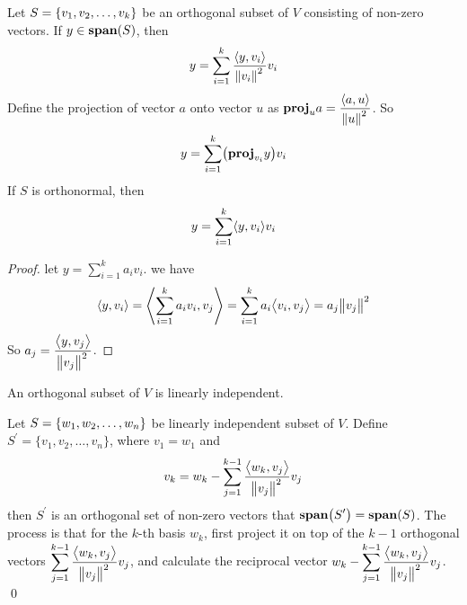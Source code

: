 \begin{theorem}
	Let $S=\set{ v_1, v_2, \dots, v_k }$ be an orthogonal subset of $V$ consisting of non-zero vectors. If $y \in \vectorspan{S}$, then
	\begin{equation}
		y = \sum_{i=1}^k \frac{\innerproduct{y}{v_i}}{\norm{v_i}^2} v_i
	\end{equation}
	Define the projection of vector $a$ onto vector $u$ as $\projection{a}{u} = \dfrac{\innerproduct{a}{u}}{\norm{u}^2}$. So 
	\begin{equation}
	    y = \sum_{i=1}^k \mleft(\projection{y}{v_i}\mright) v_i
	\end{equation}
	If $S$ is orthonormal, then
	\begin{equation}
		y = \sum_{i=1}^k \innerproduct{y}{v_i} v_i
	\end{equation}
\end{theorem}
\begin{proof}
	let $\displaystyle y = \sum_{i=1}^k a_i v_i$. we have
	\begin{equation*}
		\innerproduct{y}{v_i} = \innerproduct{\sum_{i=1}^k a_i v_i}{v_j} = \sum_{i=1}^k a_i \innerproduct{v_i}{v_j} = a_j \norm{v_j}^2
	\end{equation*}
	So $a_j = \dfrac{\innerproduct{y}{v_j}}{\norm{v_j}^2}$.
	
	
\end{proof}

\begin{theorem}
	An orthogonal subset of $V$ is linearly independent.
\end{theorem}

\begin{definition}
	Let $S=\set{w_1, w_2, \dots, w_n }$ be linearly independent subset of $V$. Define $S^\prime=\{v_1,v_2,\dots,v_n  \}$, where $v_1=w_1$ and 
	\begin{equation}
		v_k = w_k - \sum_{j=1}^{k-1} \frac{\innerproduct{w_k}{v_j}}{\norm{v_j}^2} v_j
	\end{equation}
	then $S^\prime$ is an orthogonal set of non-zero vectors that $\vectorspan{S^\prime} = \vectorspan{S}$. The process is that for the $k$-th basis $w_k$, first project it on top of the $k-1$ orthogonal vectors $\displaystyle \sum_{j=1}^{k-1} \dfrac{\innerproduct{w_k}{v_j}}{\norm{v_j}^2} v_j$, and calculate the reciprocal vector $\displaystyle w_k - \sum_{j=1}^{k-1} \dfrac{\innerproduct{w_k}{v_j}}{\norm{v_j}^2} v_j$.
	\qed
\end{definition}

